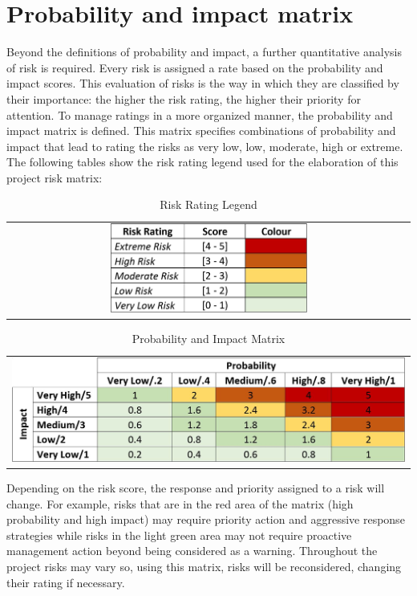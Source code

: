 \section{Probability and impact matrix}
Beyond the definitions of probability and impact, a further quantitative analysis of risk is required. Every risk is assigned a rate based on the probability and impact scores. This evaluation of risks is the way in which they are classified by their importance: the higher the risk rating, the higher their priority for attention. To manage ratings in a more organized manner, the probability and impact matrix is defined. This matrix specifies combinations of probability and impact that lead to rating the risks as very low, low, moderate, high or extreme. The following tables show the risk rating legend used for the elaboration of this project risk matrix:
\begin{table}[H]
\centering
\begin{tabular}{c}
	\includegraphics[width=0.5\textwidth]{./images/RiskRating}
\end{tabular}
\caption{Risk Rating Legend}
\end{table}
\begin{table}[H]
	\centering
	\begin{tabular}{c}
	\includegraphics[width=\textwidth]{./images/Probability_and_impact_matrix}
	\end{tabular}
	\caption{Probability and Impact Matrix}
\end{table}
Depending on the risk score, the response and priority assigned to a risk will change. For example, risks that are in the red area of the matrix (high probability and high impact) may require priority action and aggressive response strategies while risks in the light green area may not require proactive management action beyond being considered as a warning.
Throughout the project risks may vary so, using this matrix, risks will be reconsidered, changing their rating if necessary.
